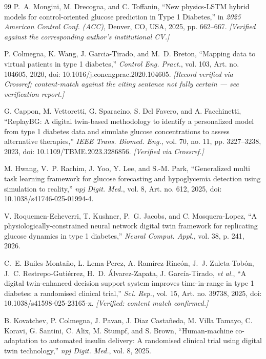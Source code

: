 \documentclass[journal]{IEEEtran}
\begin{document}
\begin{thebibliography}{99}
 P.~A. Mongini, M. Drecogna, and C. Toffanin, ``New physics-LSTM hybrid models for control-oriented glucose prediction in Type 1 Diabetes,'' in \emph{2025 American Control Conf. (ACC)}, Denver, CO, USA, 2025, pp. 662--667. \emph{[Verified against the corresponding author's institutional CV.]}

 P. Colmegna, K. Wang, J. Garcia-Tirado, and M.~D. Breton, ``Mapping data to virtual patients in type 1 diabetes,'' \emph{Control Eng. Pract.}, vol. 103, Art. no. 104605, 2020, doi: 10.1016/j.conengprac.2020.104605. \emph{[Record verified via Crossref; content-match against the citing sentence not fully certain --- see verification report.]}

 G. Cappon, M. Vettoretti, G. Sparacino, S. Del Favero, and A. Facchinetti, ``ReplayBG: A digital twin-based methodology to identify a personalized model from type 1 diabetes data and simulate glucose concentrations to assess alternative therapies,'' \emph{IEEE Trans. Biomed. Eng.}, vol. 70, no. 11, pp. 3227--3238, 2023, doi: 10.1109/TBME.2023.3286856. \emph{[Verified via Crossref.]}

 M. Hwang, V.~P. Rachim, J. Yoo, Y. Lee, and S.-M. Park, ``Generalized multi task learning framework for glucose forecasting and hypoglycemia detection using simulation to reality,'' \emph{npj Digit. Med.}, vol. 8, Art. no. 612, 2025, doi: 10.1038/s41746-025-01994-4.

 V. Roquemen-Echeverri, T. Kushner, P.~G. Jacobs, and C. Mosquera-Lopez, ``A physiologically-constrained neural network digital twin framework for replicating glucose dynamics in type 1 diabetes,'' \emph{Neural Comput. Appl.}, vol. 38, p. 241, 2026.

 C.~E. Builes-Monta\~no, L. Lema-Perez, A. Ram\'irez-Rinc\'on, J.~J. Zuleta-Tob\'on, J.~C. Restrepo-Guti\'errez, H.~D. \'Alvarez-Zapata, J. Garc\'ia-Tirado, \emph{et al.}, ``A digital twin-enhanced decision support system improves time-in-range in type 1 diabetes: a randomised clinical trial,'' \emph{Sci. Rep.}, vol. 15, Art. no. 39738, 2025, doi: 10.1038/s41598-025-23165-x. \emph{[Verified: content match confirmed.]}

 B. Kovatchev, P. Colmegna, J. Pavan, J. Diaz Casta\~neda, M. Villa Tamayo, C. Koravi, G. Santini, C. Alix, M. Stumpf, and S. Brown, ``Human-machine co-adaptation to automated insulin delivery: A randomised clinical trial using digital twin technology,'' \emph{npj Digit. Med.}, vol. 8, 2025.


\end{thebibliography}
\end{document}
